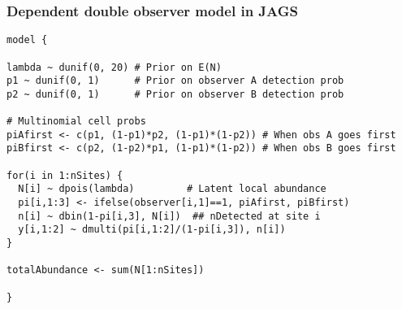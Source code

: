 \documentclass[color=usenames,dvipsnames]{beamer}\usepackage[]{graphicx}\usepackage[]{xcolor}
\makeatletter
\newenvironment{kframe}{%
 \def\at@end@of@kframe{}%
 \ifinner\ifhmode%
  \def\at@end@of@kframe{\end{minipage}}%
  \begin{minipage}{\columnwidth}%
 \fi\fi%
 \def\FrameCommand##1{\hskip\@totalleftmargin \hskip-\fboxsep
 \colorbox{shadecolor}{##1}\hskip-\fboxsep
     \hskip-\linewidth \hskip-\@totalleftmargin \hskip\columnwidth}%
 \MakeFramed {\advance\hsize-\width
   \@totalleftmargin\z@ \linewidth\hsize
   \@setminipage}}%
 {\par\unskip\endMakeFramed%
 \at@end@of@kframe}
\newenvironment{knitrout}{}{} %
\makeatother
\begin{document}
\begin{frame}[fragile]
  \frametitle{\normalsize Dependent double observer model in JAGS}
\vspace{-3pt}
\begin{knitrout}\scriptsize
{}\color{fgcolor}\begin{kframe}
\begin{verbatim}
model {

lambda ~ dunif(0, 20) # Prior on E(N)
p1 ~ dunif(0, 1)      # Prior on observer A detection prob
p2 ~ dunif(0, 1)      # Prior on observer B detection prob

# Multinomial cell probs
piAfirst <- c(p1, (1-p1)*p2, (1-p1)*(1-p2)) # When obs A goes first
piBfirst <- c(p2, (1-p2)*p1, (1-p1)*(1-p2)) # When obs B goes first

for(i in 1:nSites) {
  N[i] ~ dpois(lambda)         # Latent local abundance
  pi[i,1:3] <- ifelse(observer[i,1]==1, piAfirst, piBfirst)
  n[i] ~ dbin(1-pi[i,3], N[i])  ## nDetected at site i
  y[i,1:2] ~ dmulti(pi[i,1:2]/(1-pi[i,3]), n[i])
}

totalAbundance <- sum(N[1:nSites])

}
\end{verbatim}
\end{kframe}
\end{knitrout}
\end{frame}
\end{document}
